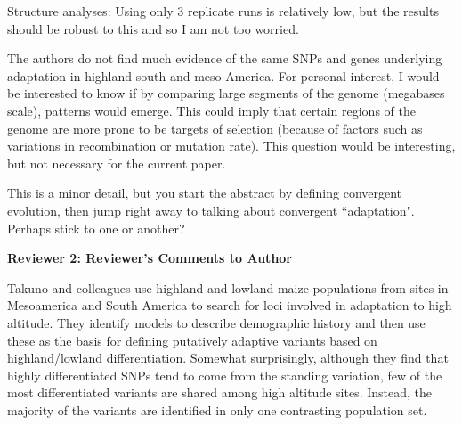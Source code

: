 \documentclass[onecolumn,oneside,letterpaper]{article}
\begin{document}
Structure analyses:  Using only 3 replicate runs is relatively low, but the results should be robust to this and so I am not too worried.  

The authors do not find much evidence of the same SNPs and genes underlying adaptation in highland south and meso-America. For personal interest, I would be interested to know if by comparing large segments of the genome (megabases scale), patterns would emerge.  This could imply that certain regions of the genome are more prone to be targets of selection  (because of factors such as variations in recombination or mutation rate). This question would be interesting, but not necessary for the current paper.    


This is a minor detail, but you start the abstract by defining convergent evolution, then jump right away to talking about convergent ``adaptation".  Perhaps stick to one or another? 


\textbf{Reviewer 2: Reviewer's Comments to Author}

Takuno and colleagues use highland and lowland maize populations from sites in Mesoamerica and South America to search for loci involved in adaptation to high altitude.  They identify models to describe demographic history and then use these as the basis for defining putatively adaptive variants based on highland/lowland differentiation.  Somewhat surprisingly, although they find that highly differentiated SNPs tend to come from the standing variation, few of the most differentiated variants are shared among high altitude sites. Instead, the majority of the variants are identified in only one contrasting population set.   
\end{document}
